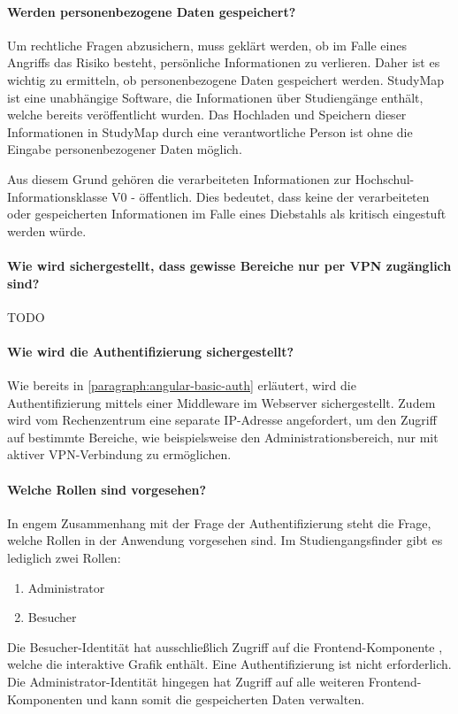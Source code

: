 \paragraph*{Werden personenbezogene Daten gespeichert?}
Um rechtliche Fragen abzusichern, muss geklärt werden, ob im Falle eines Angriffs das Risiko besteht, persönliche Informationen zu verlieren. Daher ist es wichtig zu ermitteln, ob personenbezogene Daten gespeichert werden. StudyMap ist eine unabhängige Software, die Informationen über Studiengänge enthält, welche bereits veröffentlicht wurden. Das Hochladen und Speichern dieser Informationen in StudyMap durch eine verantwortliche Person ist ohne die Eingabe personenbezogener Daten möglich.

Aus diesem Grund gehören die verarbeiteten Informationen zur Hochschul-Informationsklasse \glqq V0 - öffentlich\grqq{}. Dies bedeutet, dass keine der verarbeiteten oder gespeicherten Informationen im Falle eines Diebstahls als kritisch eingestuft werden würde.

\paragraph*{Wie wird sichergestellt, dass gewisse Bereiche nur per VPN zugänglich sind?}
TODO

\paragraph*{Wie wird die Authentifizierung sichergestellt?}
Wie bereits in \autoref{paragraph:angular-basic-auth} erläutert, wird die Authentifizierung mittels einer Middleware im Webserver sichergestellt. Zudem wird vom Rechenzentrum eine separate IP-Adresse angefordert, um den Zugriff auf bestimmte Bereiche, wie beispielsweise den Administrationsbereich, nur mit aktiver VPN-Verbindung zu ermöglichen. %

\paragraph*{Welche Rollen sind vorgesehen?}
In engem Zusammenhang mit der Frage der Authentifizierung steht die Frage, welche Rollen in der Anwendung vorgesehen sind. Im Studiengangsfinder gibt es lediglich zwei Rollen:
\begin{enumerate}
    \item Administrator
    \item Besucher
\end{enumerate}
Die Besucher-Identität hat ausschließlich Zugriff auf die Frontend-Komponente , welche die interaktive Grafik enthält. Eine Authentifizierung ist nicht erforderlich. Die Administrator-Identität hingegen hat Zugriff auf alle weiteren Frontend-Komponenten und kann somit die gespeicherten Daten verwalten.

